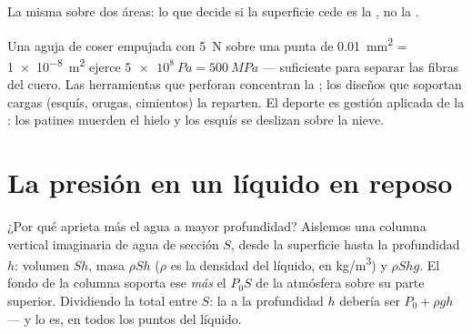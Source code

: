 \begin{omfigure}
\qquad
{}

{\small La misma  sobre dos áreas: lo que decide si la superficie
cede es la , no la .}
\end{omfigure}

\begin{remark}\label{rem:g10:pressure:tools}
Una aguja de coser empujada con \qty{5}{N} sobre una punta de
\qty{0.01}{mm^2} = \qty{1e-8}{m^2} ejerce
$\qty{5e8}{Pa} = \qty{500}{MPa}$ --- suficiente para separar las fibras
del cuero. Las herramientas que perforan concentran la ; los
diseños que soportan cargas (esquís, orugas, cimientos) la reparten. El
deporte es gestión aplicada de la : los patines muerden el hielo
y los esquís se deslizan sobre la nieve.
\end{remark}

\section{La presión en un líquido en reposo}

¿Por qué aprieta más el agua a mayor profundidad? Aislemos una columna
vertical imaginaria de agua de sección $S$, desde la superficie hasta la
profundidad $h$: volumen $Sh$, masa $\rho S h$ ($\rho$ es la densidad
del líquido, en \unit{kg/m^3}) y  $\rho S h g$. El fondo de la
columna soporta ese  \emph{más} el  $P_0 S$ de la atmósfera
sobre su parte superior. Dividiendo la  total entre $S$: la
 a la profundidad $h$ debería ser $P_0 + \rho g h$ --- y lo es,
en todos los puntos del líquido.


